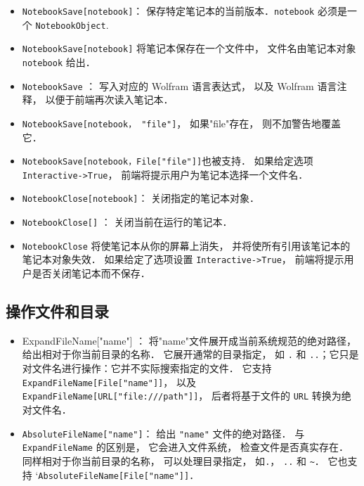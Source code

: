\begin{itemize}
\item \verb`NotebookSave[notebook]`： 保存特定笔记本的当前版本．\verb`notebook` 必须是一个 \verb`NotebookObject`.
\item \verb`NotebookSave[notebook]` 将笔记本保存在一个文件中， 文件名由笔记本对象 \verb`notebook` 给出．
\item \verb`NotebookSave` ： 写入对应的 Wolfram 语言表达式， 以及 Wolfram 语言注释， 以便于前端再次读入笔记本．
\item \verb`NotebookSave[notebook， "file"]`， 如果"file"存在， 则不加警告地覆盖它．
\item \verb`NotebookSave[notebook，File["file"]]`也被支持．
如果给定选项 \verb`Interactive->True`， 前端将提示用户为笔记本选择一个文件名．
\item \verb`NotebookClose[notebook]`： 关闭指定的笔记本对象．
\item \verb`NotebookClose[]` ： 关闭当前在运行的笔记本．
\item \verb`NotebookClose` 将使笔记本从你的屏幕上消失， 并将使所有引用该笔记本的笔记本对象失效．
如果给定了选项设置 \verb`Interactive->True`， 前端将提示用户是否关闭笔记本而不保存．
\end{itemize}




\subsection{操作文件和目录}


\begin{itemize}
\item ExpandFileName["name"] ： 将"name"文件展开成当前系统规范的绝对路径， 给出相对于你当前目录的名称．
它展开通常的目录指定， 如 \verb`.` 和 \verb`..`；它只是对文件名进行操作：它并不实际搜索指定的文件．
它支持 \verb`ExpandFileName[File["name"]]`， 以及 \verb`ExpandFileName[URL["file:///path"]]`， 
后者将基于文件的 \verb`URL` 转换为绝对文件名．
\item \verb`AbsoluteFileName["name"]`： 给出 \verb`"name"` 文件的绝对路径． 
与 \verb`ExpandFileName` 的区别是， 它会进入文件系统， 检查文件是否真实存在．
同样相对于你当前目录的名称， 可以处理目录指定， 如\verb`.`， \verb`..` 和 \verb`~`．
它也支持 `\verb`AbsoluteFileName[File["name"]]`．
\end{itemize}

